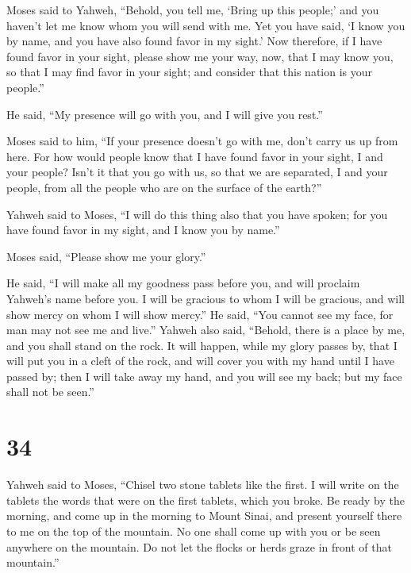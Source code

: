  Moses said to Yahweh, ``Behold, you tell me, `Bring up
this people;' and you haven't let me know whom you will send with me.
Yet you have said, `I know you by name, and you have also found favor in
my sight.'  Now therefore, if I have found favor in your
sight, please show me your way, now, that I may know you, so that I may
find favor in your sight; and consider that this nation is your
people.''

 He said, ``My presence will go with you, and I will give
you rest.''

 Moses said to him, ``If your presence doesn't go with me,
don't carry us up from here.  For how would people know
that I have found favor in your sight, I and your people? Isn't it that
you go with us, so that we are separated, I and your people, from all
the people who are on the surface of the earth?''

 Yahweh said to Moses, ``I will do this thing also that you
have spoken; for you have found favor in my sight, and I know you by
name.''

 Moses said, ``Please show me your glory.''

 He said, ``I will make all my goodness pass before you,
and will proclaim Yahweh's name before you. I will be gracious to whom I
will be gracious, and will show mercy on whom I will show mercy.''
 He said, ``You cannot see my face, for man may not see me
and live.''  Yahweh also said, ``Behold, there is a place
by me, and you shall stand on the rock.  It will happen,
while my glory passes by, that I will put you in a cleft of the rock,
and will cover you with my hand until I have passed by; 
then I will take away my hand, and you will see my back; but my face
shall not be seen.''

\hypertarget{section-33}{%
\section{34}\label{section-33}}

 Yahweh said to Moses, ``Chisel two stone tablets like the
first. I will write on the tablets the words that were on the first
tablets, which you broke.  Be ready by the morning, and come
up in the morning to Mount Sinai, and present yourself there to me on
the top of the mountain.  No one shall come up with you or
be seen anywhere on the mountain. Do not let the flocks or herds graze
in front of that mountain.''

